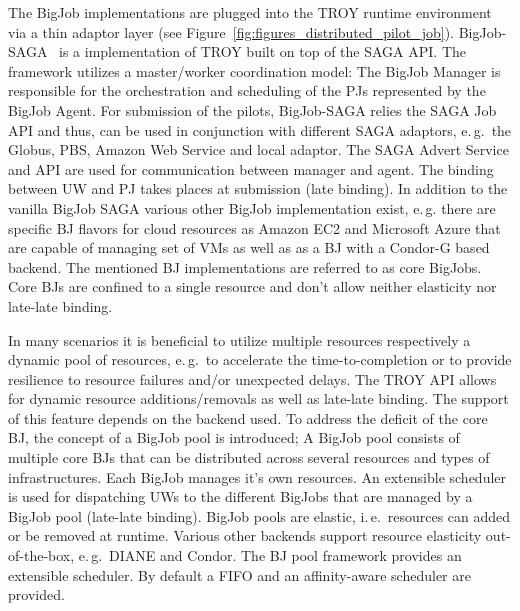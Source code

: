 \documentclass[conference,final]{IEEEtran}
\begin{document}
The BigJob implementations are plugged into the TROY runtime environment via a
thin adaptor layer (see Figure~\ref{fig:figures_distributed_pilot_job}).
BigJob-SAGA~\cite{saga_bigjob_condor_cloud} is a implementation of TROY built on
top of the SAGA API. The framework utilizes a master/worker coordination model:
The BigJob Manager is responsible for the orchestration and scheduling of the
PJs represented by the BigJob Agent. For submission of the pilots, BigJob-SAGA
relies the SAGA Job API and thus, can be used in conjunction with different SAGA
adaptors, e.\,g.\ the Globus, PBS, Amazon Web Service and local adaptor. The
SAGA Advert Service and API are used for communication between manager and
agent. The binding between UW and PJ takes places at submission (late binding). 
In addition to the vanilla BigJob SAGA various other BigJob implementation
exist, e.\,g. there are specific BJ flavors for cloud resources as Amazon EC2
and Microsoft Azure that are capable of managing set of VMs as well as as a BJ
with a Condor-G based backend. The mentioned BJ implementations are referred to 
as core BigJobs. Core BJs are confined to a single resource and don't allow 
neither elasticity nor late-late binding. 

In many scenarios it is beneficial to utilize multiple resources respectively a
dynamic pool of resources, e.\,g.\ to accelerate the time-to-completion or to
provide resilience to resource failures and/or unexpected delays. The TROY API
allows for dynamic resource additions/removals as well as late-late binding. The
support of this feature depends on the backend used. To address the deficit of
the core BJ, the concept of a BigJob pool is introduced; A BigJob pool consists
of multiple core BJs that can be distributed across several resources and types
of infrastructures. Each BigJob manages it's own resources. An extensible
scheduler is used for dispatching UWs to the different BigJobs that are managed
by a BigJob pool (late-late binding). BigJob pools are elastic, i.\,e.\
resources can added or be removed at runtime. Various other backends support
resource elasticity out-of-the-box, e.\,g.\ DIANE and Condor. The BJ pool
framework provides an extensible scheduler. By default a FIFO and an
affinity-aware scheduler are provided.

\end{document}
